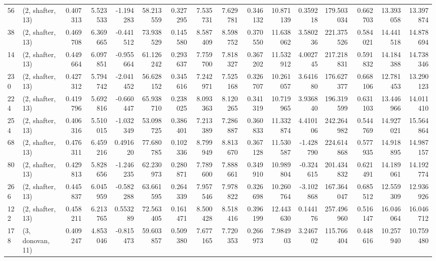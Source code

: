 \begin{tabular}{llrrrrrrrrrrrrrr}
56  &  (2, shafter, 13) &   0.407313 &   5.523533 &  -1.194283 &    58.213559 &   0.327295 &   7.535731 &   7.629781 &  0.346132 &  10.871139 &   0.359218 &    179.503034 &    0.662703 &   13.393058 &   13.397874 \\
38  &  (2, shafter, 13) &   0.469708 &   6.369665 &  -0.441512 &    73.938529 &   0.145580 &   8.587409 &   8.598752 &  0.370550 &  11.638062 &   3.580236 &    221.375526 &    0.584021 &   14.441518 &   14.878694 \\
14  &  (2, shafter, 13) &   0.449664 &   6.097851 &  -0.955664 &    61.126242 &   0.293637 &   7.759700 &   7.818327 &  0.367202 &  11.532912 &   4.002745 &    217.218831 &    0.591832 &   14.184388 &   14.738346 \\
230 &  (2, shafter, 13) &   0.427312 &   5.794742 &  -2.041452 &    56.628152 &   0.345616 &   7.242971 &   7.525168 &  0.326707 &  10.261057 &   3.641680 &    176.627377 &    0.668106 &   12.781453 &   13.290123 \\
224 &  (2, shafter, 13) &   0.419796 &   5.692816 &  -0.660447 &    65.938710 &   0.238025 &   8.093363 &   8.120265 &  0.341319 &  10.719965 &   3.936840 &    196.319599 &    0.631103 &   13.446966 &   14.011410 \\
254 &  (2, shafter, 13) &   0.406316 &   5.510015 &  -1.032349 &    53.098725 &   0.386401 &   7.213389 &   7.286887 &  0.360833 &  11.332874 &   4.410106 &    242.264982 &    0.544769 &   14.927021 &   15.564864 \\
68  &  (2, shafter, 13) &   0.476311 &   6.459216 &   0.491620 &    77.680785 &   0.102336 &   8.799949 &   8.813670 &  0.367128 &  11.530587 &  -1.428790 &    224.614868 &    0.577935 &   14.918895 &   14.987157 \\
80  &  (2, shafter, 13) &   0.429813 &   5.828656 &  -1.246235 &    62.230973 &   0.280871 &   7.789600 &   7.888661 &  0.349910 &  10.989804 &  -0.324615 &    201.434832 &    0.621491 &   14.189061 &   14.192774 \\
266 &  (2, shafter, 13) &   0.445837 &   6.045959 &  -0.582288 &    63.661595 &   0.264339 &   7.957546 &   7.978822 &  0.326698 &  10.260764 &  -3.102868 &    167.364047 &    0.685512 &   12.559309 &   12.936926 \\
122 &  (2, shafter, 13) &   0.458211 &   6.213765 &   0.553289 &    72.563405 &   0.161471 &   8.500428 &   8.518416 &  0.396199 &  12.443630 &   0.144176 &    257.496960 &    0.516147 &   16.046064 &   16.046712 \\
178 &  (3, donovan, 11) &   0.409247 &   4.853046 &  -0.815473 &    59.603857 &   0.509380 &   7.677165 &   7.720353 &  0.266973 &   7.984903 &   3.246702 &    115.766404 &    0.448616 &   10.257940 &   10.759480 \\

\end{tabular}
